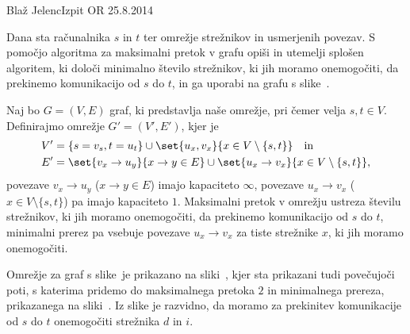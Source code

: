 \begin{naloga}{Blaž Jelenc}{Izpit OR 25.8.2014}
\begin{vprasanje}
Dana sta računalnika $s$ in $t$ ter omrežje strežnikov
in usmerjenih povezav.
S pomočjo algoritma za maksimalni pretok v grafu
opiši in utemelji splošen algoritem,
ki določi minimalno število strežnikov, ki jih moramo onemogočiti,
da prekinemo komunikacijo od $s$ do $t$,
in ga uporabi na grafu s slike~\fig.

\begin{slika}
\pgfslika
{}
\end{slika}
\end{vprasanje}

\begin{odgovor}
Naj bo $G = (V, E)$ graf, ki predstavlja naše omrežje,
pri čemer velja $s, t \in V$.
Definirajmo omrežje $G' = (V', E')$, kjer je
\begin{align*}
V' &= \{s = v_s, t = u_t\} \cup \set{u_x, v_x}{x \in V \setminus \{s, t\}}
\quad \text{in} \\
E' &= \set{v_x \to u_y}{x \to y \in E}
 \cup \set{u_x \to v_x}{x \in V \setminus \{s, t\}},
\end{align*}
povezave $v_x \to u_y$ ($x \to y \in E$) imajo kapaciteto $\infty$,
povezave $u_x \to v_x$ ($x \in V \setminus \{s, t\}$) pa imajo kapaciteto $1$.
Maksimalni pretok v omrežju ustreza številu strežnikov,
ki jih moramo onemogočiti, da prekinemo komunikacijo od $s$ do $t$,
minimalni prerez pa vsebuje povezave $u_x \to v_x$ za tiste strežnike $x$,
ki jih moramo onemogočiti.

Omrežje za graf s slike~\fig je prikazano na sliki~,
kjer sta prikazani tudi povečujoči poti,
s katerima pridemo do maksimalnega pretoka $2$ in minimalnega prereza,
prikazanega na sliki~.
Iz slike je razvidno, da moramo za prekinitev komunikacije od $s$ do $t$
onemogočiti strežnika $d$ in $i$.

\begin{slika}
\end{slika}
\begin{slika}
\end{slika}
\end{odgovor}
\end{naloga}
